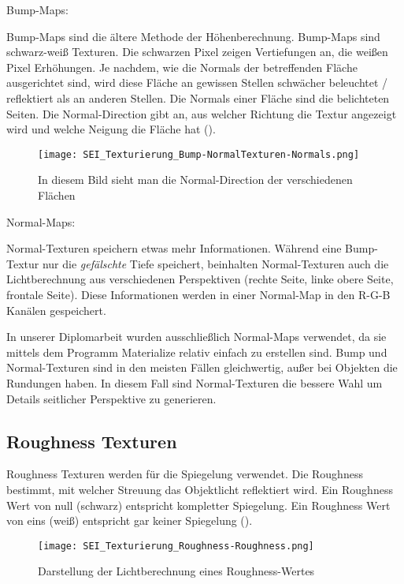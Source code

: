 {Bump-Maps:

Bump-Maps sind die ältere Methode der Höhenberechnung. Bump-Maps sind schwarz-weiß Texturen. Die schwarzen Pixel
zeigen Vertiefungen an, die weißen Pixel Erhöhungen. Je nachdem, wie die Normals der betreffenden Fläche ausgerichtet
sind, wird diese Fläche an gewissen Stellen schwächer beleuchtet / reflektiert als an anderen Stellen. Die Normals
einer Fläche sind die belichteten Seiten. Die Normal-Direction gibt an, aus welcher Richtung die Textur angezeigt
wird und welche Neigung die Fläche hat ().

\begin{figure}[H]
\centering
\texttt{[image: SEI\_Texturierung\_Bump-NormalTexturen-Normals.png]}
\caption{In diesem Bild sieht man die Normal-Direction der verschiedenen Flächen}
\label{picture:normals}
\end{figure}


Normal-Maps:

Normal-Texturen speichern etwas mehr Informationen. Während eine Bump-Textur nur die \textit{gefälschte} Tiefe
speichert, beinhalten Normal-Texturen auch die Lichtberechnung aus verschiedenen Perspektiven (rechte Seite,
linke obere Seite, frontale Seite). Diese Informationen werden in einer Normal-Map in den R-G-B Kanälen gespeichert.

In unserer Diplomarbeit wurden ausschließlich Normal-Maps verwendet, da sie mittels dem Programm
Materialize\citep{bbs:materialize} relativ einfach zu erstellen sind. Bump und Normal-Texturen sind in den meisten
Fällen gleichwertig, außer bei Objekten die Rundungen haben. In diesem Fall sind Normal-Texturen die bessere Wahl
um Details seitlicher Perspektive zu generieren.

\subsection{Roughness Texturen}
\label{sec:tex_roughness}

Roughness Texturen werden für die Spiegelung verwendet. Die Roughness bestimmt, mit welcher Streuung das Objektlicht
reflektiert wird. Ein Roughness Wert von null (schwarz) entspricht kompletter Spiegelung. Ein Roughness Wert von eins
(weiß) entspricht gar keiner Spiegelung ().

\begin{figure}[H]
\centering
\texttt{[image: SEI\_Texturierung\_Roughness-Roughness.png]}
\caption{Darstellung der Lichtberechnung eines Roughness-Wertes}
\label{picture:roughness_illustration}
\end{figure}


}
